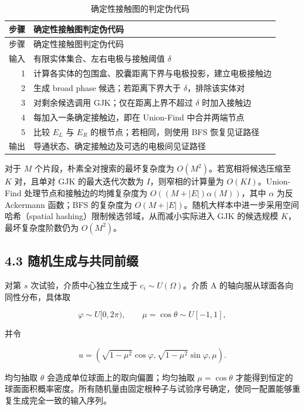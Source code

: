 \begin{longtable}[]{@{}rl@{}}
\caption{确定性接触图的判定伪代码}\tabularnewline
\toprule\noalign{}
步骤 & 确定性接触图判定伪代码 \\
\midrule\noalign{}
\endfirsthead
\toprule\noalign{}
步骤 & 确定性接触图判定伪代码 \\
\midrule\noalign{}
\endhead
\bottomrule\noalign{}
\endlastfoot
输入 & 有限实体集合、左右电极与接触阈值 \(\delta\) \\
1 & 计算各实体的包围盒、胶囊距离下界与电极投影，建立电极接触边 \\
2 & 生成 broad phase 候选；若距离下界大于 \(\delta\)，排除该实体对 \\
3 & 对剩余候选调用 GJK；仅在距离上界不超过 \(\delta\) 时加入接触边 \\
4 & 每加入一条确定接触边，即在 Union-Find 中合并两端节点 \\
5 & 比较 \(E_L\) 与 \(E_R\) 的根节点；若相同，则使用 BFS 恢复见证路径 \\
输出 & 导通状态、确定接触边及可选的电极间见证路径 \\
\end{longtable}

对于 \(M\) 个片段，朴素全对搜索的最坏复杂度为 \(O(M^2)\)。若宽相将候选压缩至 \(K\) 对，且单对 GJK 的最大迭代次数为 \(I\)，则窄相的计算量为 \(O(KI)\)。Union-Find 处理节点和接触边的均摊复杂度为 \(O((M+\lvert E\rvert)\alpha(M))\)，其中 \(\alpha\) 为反 Ackermann 函数；BFS 的复杂度为 \(O(M+\lvert E\rvert)\)。随机大样本中进一步采用空间哈希（spatial hashing）限制候选邻域，从而减小实际进入 GJK 的候选规模 \(K\)，最坏复杂度阶数仍为 \(O(M^2)\)。

\subsection{4.3 随机生成与共同前缀}\label{ux968fux673aux751fux6210ux4e0eux5171ux540cux524dux7f00}

对第 \(s\) 次试验，介质中心独立生成于 \(c_i\sim U(\Omega)\)。介质 A 的轴向服从球面各向同性分布，具体取

\[
\varphi\sim U[0,2\pi),\qquad \mu=\cos\theta\sim U[-1,1],
\]

并令

\[
u=\left(\sqrt{1-\mu^2}\cos\varphi,
\sqrt{1-\mu^2}\sin\varphi,\mu\right).
\]

均匀抽取 \(\theta\) 会造成单位球面上的取向偏置；均匀抽取 \(\mu=\cos\theta\) 才能得到恒定的球面面积概率密度。所有随机量由固定根种子与试验序号确定，使同一配置能够重复生成完全一致的输入序列。

